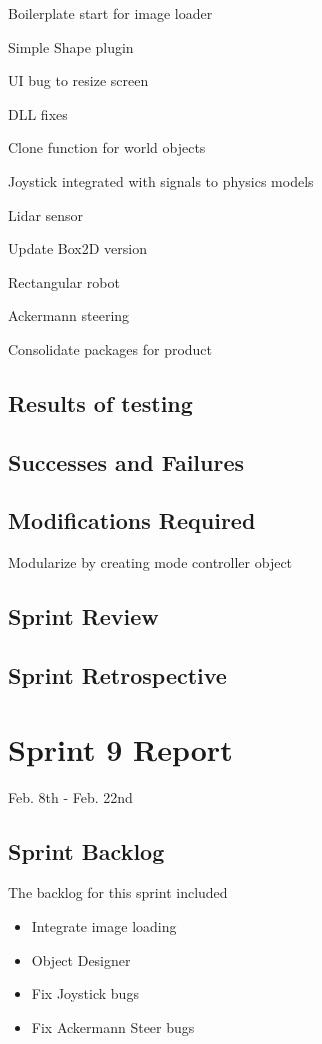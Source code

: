 	\item Boilerplate start for image loader
	\item Simple Shape plugin
	\item UI bug to resize screen
	\item DLL fixes
	\item Clone function for world objects
	\item Joystick integrated with signals to physics models
	\item Lidar sensor
	\item Update Box2D version
	\item Rectangular robot
	\item Ackermann steering
	\item Consolidate packages for product

\subsection{Results of testing}


\subsection{Successes and Failures}


\subsection{Modifications Required}

Modularize by creating mode controller object

\subsection{Sprint Review}


\subsection{Sprint Retrospective}
\section{Sprint 9 Report}
Feb. 8th - Feb. 22nd
\subsection{Sprint Backlog}

The backlog for this sprint included

\begin{itemize}
	\item Integrate image loading
	\item Object Designer	
	\item Fix Joystick bugs
	\item Fix Ackermann Steer bugs
\end{itemize}

